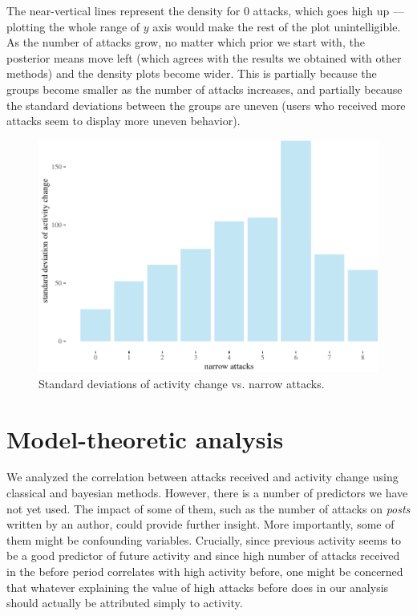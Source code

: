 \documentclass[10pt,]{scrartcl}
\begin{document}
\normalsize

The near-vertical lines represent the density for 0 attacks, which goes
high up --- plotting the whole range of \(y\) axis would make the rest
of the plot unintelligible. As the number of attacks grow, no matter
which prior we start with, the posterior means move left (which agrees
with the results we obtained with other methods) and the density plots
become wider. This is partially because the groups become smaller as the
number of attacks increases, and partially because the standard
deviations between the groups are uneven (users who received more
attacks seem to display more uneven behavior).

\begin{figure}[!ht]

\begin{center}\includegraphics[width=1\linewidth]{redditAnalysisWalkthrough_files/figure-latex/unnamed-chunk-64-1} \end{center}
\caption{Standard deviations of  activity change vs. narrow attacks.}
\label{fig:bayesian3'}
\end{figure}

\section{Model-theoretic analysis}

\normalsize

We analyzed the correlation between attacks received and activity change
using classical and bayesian methods. However, there is a number of
predictors we have not yet used. The impact of some of them, such as the
number of attacks on \emph{posts} written by an author, could provide
further insight. More importantly, some of them might be confounding
variables. Crucially, since previous activity seems to be a good
predictor of future activity and since high number of attacks received
in the \textsf{before} period correlates with high activity before, one
might be concerned that whatever explaining the value of high attacks
before does in our analysis should actually be attributed simply to
activity.
\end{document}
